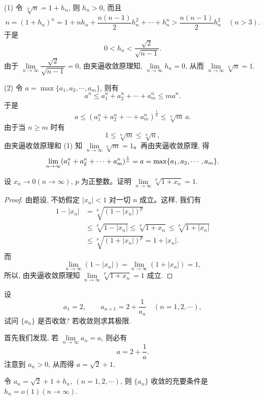 \begin{solve}
(1) 令 $\sqrt[n]{n}=1+h_n$, 则 $h_n>0$, 而且
\[
  n=(1+h_n)^n
  =
  1+nh_n+\frac{n(n-1)}2h_n^2+\cdots+h_n^n
  >
  \frac{n(n-1)}2h_n^2\quad(n>3).
\]
于是
\[
  0<h_n<\frac{\sqrt2}{\sqrt{n-1}}.
\]
由于 $\lim\limits_{n\to\infty}\dfrac{\sqrt2}{\sqrt{n-1}}=0$, 由夹逼收敛原理知, $\lim\limits_{n\to\infty}h_n=0$, 从而 $\lim\limits_{n\to\infty}\sqrt[n]{n}=1$.

(2) 令 $a=\max\{a_1,a_2,\cdots,a_m\}$, 则有
\[
  a^n\leqslant a_1^n+a_2^n+\cdots+a_m^n\leqslant ma^n.
\]
于是
\[
  a\leqslant (a_1^n+a_2^n+\cdots+a_m^n)^{\frac1n}\leqslant \sqrt[n]{m}\,a.
\]
由于当 $n\geqslant m$ 时有
\[
  1\leqslant\sqrt[n]{m}\leqslant\sqrt[n]{n},
\]
由夹逼收敛原理和 (1) 知 $\lim\limits_{n\to\infty}\sqrt[n]{m}=1$。再由夹逼收敛原理, 得
\[
  \lim_{n\to\infty}(a_1^n+a_2^n+\cdots+a_m^n)^{\frac1n}
  =
  a
  =
  \max\{a_1,a_2,\cdots,a_m\}.
\qedhere
\]
\end{solve}


\begin{example}\label{example:ma-2-2-3}
设 $x_n\to0(n\to\infty)$, $p$ 为正整数。证明 $\lim\limits_{n\to\infty}\sqrt[p]{1+x_n}=1$.
\end{example}


\begin{proof}
由题设, 不妨假定 $|x_n|<1$ 对一切 $n$ 成立。这样, 我们有
\[
\begin{aligned}
  1-|x_n|
  &=\sqrt[p]{(1-|x_n|)^p}\\
  &\leqslant \sqrt[p]{1-|x_n|}
   \leqslant \sqrt[p]{1+x_n}
   \leqslant \sqrt[p]{1+|x_n|}\\
  &\leqslant \sqrt[p]{(1+|x_n|)^p}
  =1+|x_n|.
\end{aligned}
\]
而
\[
  \lim_{n\to\infty}(1-|x_n|)
  =
  \lim_{n\to\infty}(1+|x_n|)
  =
  1,
\]
所以, 由夹逼收敛原理知 $\lim\limits_{n\to\infty}\sqrt[p]{1+x_n}=1$ 成立.
\end{proof}


\begin{example}\label{example:ma-2-2-4}
设
\[
  a_1=2,\qquad a_{n+1}=2+\frac1{a_n}\quad(n=1,2,\cdots),
\]
试问 $\{a_n\}$ 是否收敛? 若收敛则求其极限.
\end{example}


\begin{analyze}
首先我们发现, 若 $\lim\limits_{n\to\infty}a_n=a$, 则必有
\[
  a=2+\frac1a.
\]
注意到 $a_n>0$, 从而得 $a=\sqrt2+1$.

令 $a_n=\sqrt2+1+h_n,\ (n=1,2,\cdots)$, 则 $\{a_n\}$ 收敛的充要条件是 $h_n=o(1)(n\to\infty)$.
\end{analyze}


